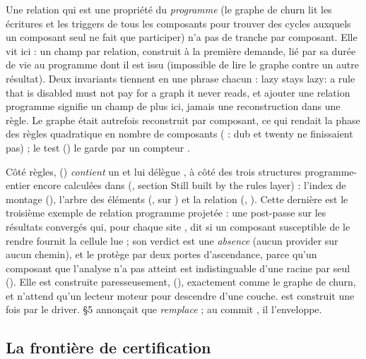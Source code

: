 Une relation qui est une propriété du \emph{programme} (le graphe de churn lit les écritures et les triggers de tous les composants pour trouver des cycles auxquels un composant seul ne fait que participer) n'a pas de tranche par composant. Elle vit ici : un champ  par relation, construit à la première demande, lié par sa durée de vie  au programme dont il est issu (impossible de lire le graphe contre un autre résultat). Deux invariants tiennent en une phrase chacun : \og lazy stays lazy: a rule that is disabled must not pay for a graph it never reads\fg{}, et ajouter une relation programme signifie un champ de plus ici, jamais une reconstruction dans une règle. Le graphe était autrefois reconstruit par composant, ce qui rendait la phase des règles quadratique en nombre de composants ( : dub et twenty ne finissaient pas) ; le test  () le garde par un compteur .

Côté règles,  () \emph{contient} un  et lui délègue , à côté des trois structures programme-entier encore calculées dans  (, section \og Still built by the rules layer\fg{}) : l'index de montage (), l'arbre des éléments (, sur ) et la relation  (, ). Cette dernière est le troisième exemple de relation programme projetée : une post-passe sur les résultats convergés qui, pour chaque site , dit si un composant susceptible de le rendre fournit la cellule lue ; son verdict est une \emph{absence} (\og aucun provider sur aucun chemin\fg{}), et  le protège par deux portes d'ascendance, parce qu'un composant que l'analyse n'a pas atteint est indistinguable d'une racine par  seul (). Elle est construite paresseusement,  (), exactement comme le graphe de churn, et n'attend qu'un lecteur moteur pour descendre d'une couche.  est construit une fois par le driver.  §5 annonçait que  \emph{remplace}  ; au commit \snapshotCommit, il l'enveloppe.

\subsection{La frontière de certification}

